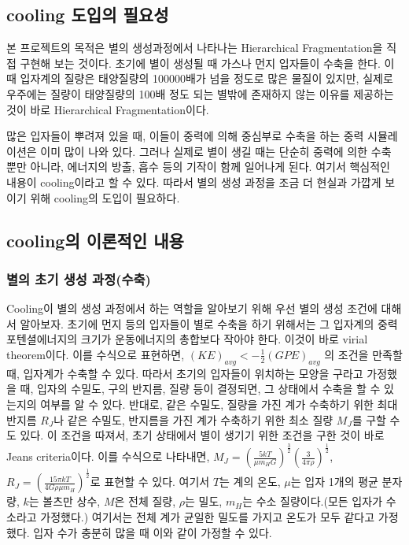 \documentclass{gshs-hutech}
\begin{document}
\subsection{cooling 도입의 필요성}

본 프로젝트의 목적은 별의 생성과정에서 나타나는 Hierarchical Fragmentation을 직접 구현해 보는 것이다. 초기에 별이 생성될 때 가스나 먼지 입자들이 수축을 한다. 이 때 입자계의 질량은 태양질량의 100000배가 넘을 정도로 많은 물질이 있지만, 실제로 우주에는 질량이 태양질량의 100배 정도 되는 별밖에 존재하지 않는 이유를 제공하는 것이 바로 Hierarchical Fragmentation이다. 

많은 입자들이 뿌려져 있을 때, 이들이 중력에 의해 중심부로 수축을 하는 중력 시뮬레이션은 이미 많이 나와 있다. 그러나 실제로 별이 생길 때는 단순히 중력에 의한 수축 뿐만 아니라, 에너지의 방출, 흡수 등의 기작이 함께 일어나게 된다. 여기서 핵심적인 내용이 cooling이라고 할 수 있다. 따라서 별의 생성 과정을 조금 더 현실과 가깝게 보이기 위해 cooling의 도입이 필요하다.

\subsection{cooling의 이론적인 내용}

\subsubsection{별의 초기 생성 과정(수축)}

Cooling이 별의 생성 과정에서 하는 역할을 알아보기 위해 우선 별의 생성 조건에 대해서 알아보자. 초기에 먼지 등의 입자들이 별로 수축을 하기 위해서는 그 입자계의 중력 포텐셜에너지의 크기가 운동에너지의 총합보다 작아야 한다. 이것이 바로 virial theorem이다. 이를 수식으로 표현하면, $(KE)_{avg}<-\frac{1}{2} (GPE)_{avg}$ 의 조건을 만족할 때, 입자계가 수축할 수 있다. 따라서 초기의 입자들이 위치하는 모양을 구라고 가정했을 때, 입자의 수밀도, 구의 반지름, 질량 등이 결정되면, 그 상태에서 수축을 할 수 있는지의 여부를 알 수 있다. 반대로, 같은 수밀도, 질량을 가진 계가 수축하기 위한 최대 반지름 $R_J$나 같은 수밀도, 반지름을 가진 계가 수축하기 위한 최소 질량
$M_J$를 구할 수도 있다. 이 조건을 따져서, 초기 상태에서 별이 생기기 위한 조건을 구한 것이 바로 Jeans criteria이다. 이를 수식으로 나타내면, $M_J=(\frac{5kT}{\mu m_HG})^{\frac{3}{2}}(\frac{3}{4\pi \rho})^{\frac{1}{2}}$,
$R_J=(\frac{15\pi kT}{4G\rho \mu m_H})^{\frac{1}{2}}$로 표현할 수 있다. 여기서 $T$는 계의 온도, $\mu$는 입자 1개의 평균 분자량, $k$는 볼츠만 상수, $M$은 전체 질량, $\rho$는 밀도, $m_H$는 수소 질량이다.(모든 입자가 수소라고 가정했다.) 여기서는 전체 계가 균일한 밀도를 가지고 온도가 모두 같다고 가정했다. 입자 수가 충분히 많을 때 이와 같이 가정할 수 있다.
 
\end{document}
